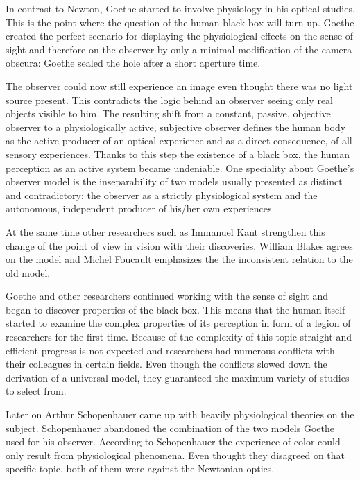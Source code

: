 \documentclass[12pt,a4paper]{article}
\begin{document}
In contrast to Newton, Goethe started to involve physiology in his optical studies. This is the point where
the question of the human black box will turn up. Goethe created the perfect scenario for displaying the
physiological effects on the sense of sight and therefore on the observer by only a minimal modification of the
camera obscura: Goethe sealed the hole after a short aperture time.

The observer could now still experience an image even thought there was no
light source present. This contradicts the logic behind an observer seeing only real objects visible to him.
The resulting shift from a constant, passive, objective observer to a physiologically active, subjective
observer defines the human body as the active producer of an optical experience and as a direct
consequence, of all sensory experiences.
Thanks to this step the existence of a black box, the human perception as an active system became
undeniable. One speciality about Goethe's observer model is the inseparability of two models usually
presented as distinct and contradictory: the observer as a strictly physiological system and the
autonomous, independent producer of his/her own experiences.

At the same time other researchers such as Immanuel Kant strengthen this change of the point of view
in vision with their discoveries. William Blakes agrees on the model and Michel Foucault
emphasizes the the inconsistent relation to the old model.

Goethe and other researchers continued working with the sense of sight and began to discover
properties of the black box.
This means that the human itself started to examine the complex properties of its perception
in form of a legion of researchers for the first time. Because of the complexity of this topic
straight and efficient progress is not expected and researchers had numerous conflicts with
their colleagues in certain fields. Even though the conflicts slowed down the derivation of a
universal model, they guaranteed the maximum variety of studies to select from.

Later on Arthur Schopenhauer came up with heavily physiological theories on the subject. Schopenhauer
abandoned the combination of the two models Goethe used for his observer. According to Schopenhauer
the experience of color could only result from physiological phenomena. Even thought they disagreed on
that specific topic, both of them were against the Newtonian optics.


\newpage



\end{document}
